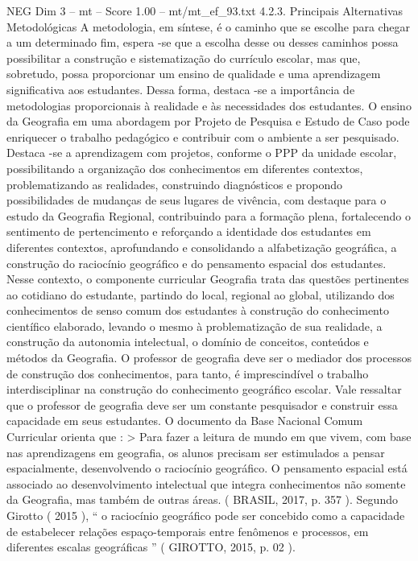 \begin{textsample}{NEG Dim 3 – mt – Score 1.00 – mt/mt\_ef\_93.txt}  \label{ex:f3_neg_219}
4.2.3.
Principais Alternativas Metodológicas A metodologia, em síntese, é o caminho que se escolhe para chegar a um determinado fim, espera -se que a escolha desse ou desses caminhos possa possibilitar a construção e sistematização do currículo escolar, mas que, sobretudo, possa proporcionar um ensino de qualidade e uma aprendizagem significativa aos estudantes.
Dessa forma, destaca -se a importância de metodologias proporcionais à realidade e às necessidades dos estudantes.
O ensino da Geografia em uma abordagem por Projeto de Pesquisa e Estudo de Caso pode enriquecer o trabalho pedagógico e contribuir com o ambiente a ser pesquisado.
Destaca -se a aprendizagem com projetos, conforme o PPP da unidade escolar, possibilitando a organização dos conhecimentos em diferentes contextos, problematizando as realidades, construindo diagnósticos e propondo possibilidades de mudanças de seus lugares de vivência, com destaque para o estudo da Geografia Regional, contribuindo para a formação plena, fortalecendo o sentimento de pertencimento e reforçando a identidade dos estudantes em diferentes contextos, aprofundando e consolidando a alfabetização geográfica, a construção do raciocínio geográfico e do pensamento espacial dos estudantes.
Nesse contexto, o componente curricular Geografia trata das questões pertinentes ao cotidiano do estudante, partindo do local, regional ao global, utilizando dos conhecimentos de senso comum dos estudantes à construção do conhecimento científico elaborado, levando o mesmo à problematização de sua realidade, a construção da autonomia intelectual, o domínio de conceitos, conteúdos e métodos da Geografia.
O professor de geografia deve ser o mediador dos processos de construção dos conhecimentos, para tanto, é imprescindível o trabalho interdisciplinar na construção do conhecimento geográfico escolar.
Vale ressaltar que o professor de geografia deve ser um constante pesquisador e construir essa capacidade em seus estudantes.
O documento da Base Nacional Comum Curricular orienta que : > Para fazer a leitura de mundo em que vivem, com base nas aprendizagens em geografia, os alunos precisam ser estimulados a pensar espacialmente, desenvolvendo o raciocínio geográfico.
O pensamento espacial está associado ao desenvolvimento intelectual que integra conhecimentos não somente da Geografia, mas também de outras áreas. ( BRASIL, 2017, p. 357 ).
Segundo Girotto ( 2015 ), “ o raciocínio geográfico pode ser concebido como a capacidade de estabelecer relações espaço-temporais entre fenômenos e processos, em diferentes escalas geográficas ” ( GIROTTO, 2015, p. 02 ).

\end{textsample}
